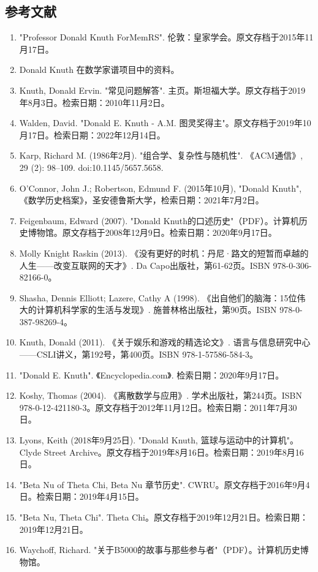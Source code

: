 \subsection{参考文献}
\begin{enumerate}
\item "Professor Donald Knuth ForMemRS". 伦敦：皇家学会。原文存档于2015年11月17日。
\item Donald Knuth 在数学家谱项目中的资料。
\item Knuth, Donald Ervin. "常见问题解答". 主页。斯坦福大学。原文存档于2019年8月3日。检索日期：2010年11月2日。
\item Walden, David. "Donald E. Knuth - A.M. 图灵奖得主"。原文存档于2019年10月17日。检索日期：2022年12月14日。
\item Karp, Richard M. (1986年2月). "组合学、复杂性与随机性". 《ACM通信》, 29 (2): 98–109. doi:10.1145/5657.5658.
\item O'Connor, John J.; Robertson, Edmund F. (2015年10月), "Donald Knuth", 《数学历史档案》，圣安德鲁斯大学，检索日期：2021年7月2日。
\item Feigenbaum, Edward (2007). "Donald Knuth的口述历史"（PDF）。计算机历史博物馆。原文存档于2008年12月9日。检索日期：2020年9月17日。
\item Molly Knight Raskin (2013). 《没有更好的时机：丹尼·路文的短暂而卓越的人生——改变互联网的天才》. Da Capo出版社，第61-62页。ISBN 978-0-306-82166-0。
\item Shasha, Dennis Elliott; Lazere, Cathy A (1998). 《出自他们的脑海：15位伟大的计算机科学家的生活与发现》. 施普林格出版社，第90页。ISBN 978-0-387-98269-4。
\item Knuth, Donald (2011). 《关于娱乐和游戏的精选论文》. 语言与信息研究中心——CSLI讲义，第192号，第400页。ISBN 978-1-57586-584-3。
\item "Donald E. Knuth". 《Encyclopedia.com》. 检索日期：2020年9月17日。
\item Koshy, Thomas (2004). 《离散数学与应用》. 学术出版社，第244页。ISBN 978-0-12-421180-3。原文存档于2012年11月12日。检索日期：2011年7月30日。
\item Lyons, Keith (2018年9月25日). "Donald Knuth, 篮球与运动中的计算机"。Clyde Street Archive。原文存档于2019年8月16日。检索日期：2019年8月16日。
\item "Beta Nu of Theta Chi, Beta Nu 章节历史". CWRU。原文存档于2016年9月4日。检索日期：2019年4月15日。
\item "Beta Nu, Theta Chi". Theta Chi。原文存档于2019年12月21日。检索日期：2019年12月21日。
\item Waychoff, Richard. "关于B5000的故事与那些参与者"（PDF）。计算机历史博物馆。

\end{enumerate}
